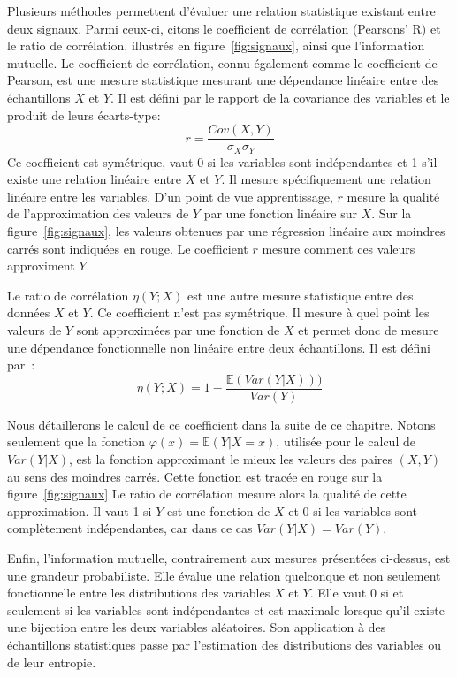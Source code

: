 \documentclass[../main]{subfiles}
\begin{document}
Plusieurs méthodes permettent d'évaluer une relation statistique existant entre deux signaux.
Parmi ceux-ci, citons le coefficient de corrélation (Pearsons' R) et le ratio de corrélation, illustrés en figure~\ref{fig:signaux}, ainsi que l'information mutuelle.
Le coefficient de corrélation, connu également comme le coefficient de Pearson, est une mesure statistique mesurant une dépendance linéaire entre des échantillons $X$ et $Y$. Il est défini par le rapport de la covariance des variables et le produit de leurs écarts-type:
\begin{equation}
    r = \frac{Cov(X,Y)}{\sigma_X \sigma_Y} 
\end{equation}
Ce coefficient est symétrique, vaut 0 si les variables sont indépendantes et 1 s'il existe une relation linéaire entre $X$ et $Y$. Il mesure spécifiquement une relation linéaire entre les variables. 
D'un point de vue apprentissage, $r$ mesure la qualité de l'approximation des valeurs de $Y$ par une fonction linéaire sur $X$. 
Sur la figure~\ref{fig:signaux}, les valeurs obtenues par une régression linéaire aux moindres carrés sont indiquées en rouge. Le coefficient $r$ mesure comment ces valeurs approximent $Y$. 

Le ratio de corrélation $\eta(Y;X)$ est une autre mesure statistique entre des données $X$ et $Y$. Ce coefficient n'est pas symétrique. Il mesure à quel point les valeurs de $Y$ sont approximées par une fonction de $X$ et permet donc de mesure une dépendance fonctionnelle non linéaire entre deux échantillons.
Il est défini par~:
\begin{equation}
    \eta(Y;X) = 1 - \frac{\mathbb{E}(Var(Y|X)))}{Var(Y)}
\end{equation}

Nous détaillerons le calcul de ce coefficient dans la suite de ce chapitre. Notons seulement que la fonction $\varphi(x) = \mathbb{E}(Y|X = x)$, utilisée pour le calcul de $Var(Y|X)$, est la fonction approximant le mieux les valeurs des paires $(X,Y)$ au sens des moindres carrés. Cette fonction est tracée en rouge sur la figure~\ref{fig:signaux}
Le ratio de corrélation mesure alors la qualité de cette approximation. Il vaut 1 si $Y$ est une fonction de $X$ et 0 si les variables sont complètement indépendantes, car dans ce cas $Var(Y|X) = Var(Y)$.

Enfin, l'information mutuelle, contrairement aux mesures présentées ci-dessus, est une grandeur probabiliste.
Elle évalue une relation quelconque et non seulement fonctionnelle entre les distributions des variables $X$ et $Y$. Elle vaut 0 si et seulement si les variables sont indépendantes et est maximale lorsque qu'il existe une bijection entre les deux variables aléatoires.
Son application à des échantillons statistiques passe par l'estimation des distributions des variables ou de leur entropie.
\end{document}
